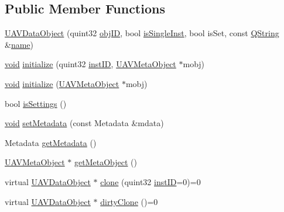 \subsection*{\-Public \-Member \-Functions}
\begin{DoxyCompactItemize}
\item 
\hyperlink{group___u_a_v_objects_plugin_ga98ff6f0f25a431f4efce59fcbe9176e5}{\-U\-A\-V\-Data\-Object} (quint32 \hyperlink{group___u_a_v_objects_plugin_gafc50acdaa311c9fd9aaddf90fd578c14}{obj\-I\-D}, bool \hyperlink{group___u_a_v_objects_plugin_gaa279cad3a000cc930e7f386672426bcb}{is\-Single\-Inst}, bool is\-Set, const \hyperlink{group___u_a_v_objects_plugin_gab9d252f49c333c94a72f97ce3105a32d}{\-Q\-String} \&\hyperlink{group___u_a_v_objects_plugin_gadf898ed0961464f4a3f8e05fb28019f5}{name})
\item 
\hyperlink{group___u_a_v_objects_plugin_ga444cf2ff3f0ecbe028adce838d373f5c}{void} \hyperlink{group___u_a_v_objects_plugin_ga9f3e150d973455c643bc5f582433cd51}{initialize} (quint32 \hyperlink{group___u_a_v_objects_plugin_gad8d656542a04e9fbef607ff178f6d9d3}{inst\-I\-D}, \hyperlink{class_u_a_v_meta_object}{\-U\-A\-V\-Meta\-Object} $\ast$mobj)
\item 
\hyperlink{group___u_a_v_objects_plugin_ga444cf2ff3f0ecbe028adce838d373f5c}{void} \hyperlink{group___u_a_v_objects_plugin_ga15063ab51e35069afd31709cc2f43276}{initialize} (\hyperlink{class_u_a_v_meta_object}{\-U\-A\-V\-Meta\-Object} $\ast$mobj)
\item 
bool \hyperlink{group___u_a_v_objects_plugin_ga77932d3af8bd55182bbc39af1f01f447}{is\-Settings} ()
\item 
\hyperlink{group___u_a_v_objects_plugin_ga444cf2ff3f0ecbe028adce838d373f5c}{void} \hyperlink{group___u_a_v_objects_plugin_ga968c4e54cd5088bed83546338e44de6b}{set\-Metadata} (const \-Metadata \&mdata)
\item 
\-Metadata \hyperlink{group___u_a_v_objects_plugin_ga8c0434ba77ed0cfbcc2306bdc6b0248c}{get\-Metadata} ()
\item 
\hyperlink{class_u_a_v_meta_object}{\-U\-A\-V\-Meta\-Object} $\ast$ \hyperlink{group___u_a_v_objects_plugin_gae14c5b7e20f137db436d3c1e7d1949ec}{get\-Meta\-Object} ()
\item 
virtual \hyperlink{class_u_a_v_data_object}{\-U\-A\-V\-Data\-Object} $\ast$ \hyperlink{group___u_a_v_objects_plugin_ga9c113847ecf6bd99cf7efe3535620e66}{clone} (quint32 \hyperlink{group___u_a_v_objects_plugin_gad8d656542a04e9fbef607ff178f6d9d3}{inst\-I\-D}=0)=0
\item 
virtual \hyperlink{class_u_a_v_data_object}{\-U\-A\-V\-Data\-Object} $\ast$ \hyperlink{group___u_a_v_objects_plugin_gae075ec1715d23e8bff81e913bc1dd303}{dirty\-Clone} ()=0
\end{DoxyCompactItemize}


